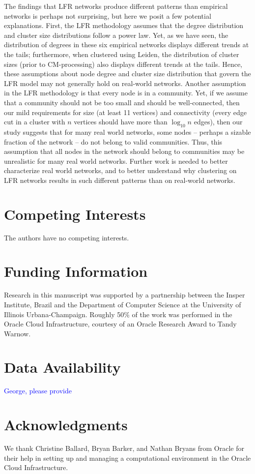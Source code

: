 \documentclass[11pt]{article}   	%
\begin{document}
The findings that LFR networks produce different patterns than empirical networks is perhaps not surprising, but here we posit a few potential explanations.
First, the LFR methodology assumes that the degree distribution and cluster size distributions follow a power law.
Yet, as we have seen, the distribution of degrees in these six empirical networks displays different trends at the tails; furthermore, when clustered using Leiden, the distribution of cluster sizes (prior to CM-processing) also displays different trends at the tails. 
Hence, these assumptions about node degree and cluster size distribution that govern the LFR model may not  generally hold on real-world networks.
Another assumption in the LFR methodology is that every node is in a community.  Yet, if we assume that a community should not be too small and should be well-connected, then
our mild requirements for size (at least 11 vertices) and connectivity (every edge cut in a cluster with $n$ vertices should have more than $\log_{10}n$ edges), then our
study suggests that for many real world networks, some nodes -- perhaps a sizable fraction of the network -- do not belong to valid communities.
Thus, this assumption that all nodes in the network should belong to communities may be unrealistic for many real world networks.
Further work is needed to better characterize real world networks, and to better understand why clustering on LFR networks results in such different patterns than on real-world networks.



\section*{Competing Interests} \vspace{3mm} The authors have no competing interests.

\section*{Funding Information} Research in this manuscript was supported by a partnership between the Insper Institute, Brazil and the Department of Computer Science at the University of Illinois Urbana-Champaign. Roughly
50\% of the work was performed in the Oracle Cloud Infrastructure, courtesy of an Oracle Research Award to Tandy Warnow.

\section*{Data Availability}
\textcolor{blue}{George, please provide}

\section*{Acknowledgments} We thank Christine Ballard, Bryan Barker, and Nathan Bryans from Oracle for their help in setting up and managing a computational environment in the Oracle Cloud Infrastructure.



\end{document}
